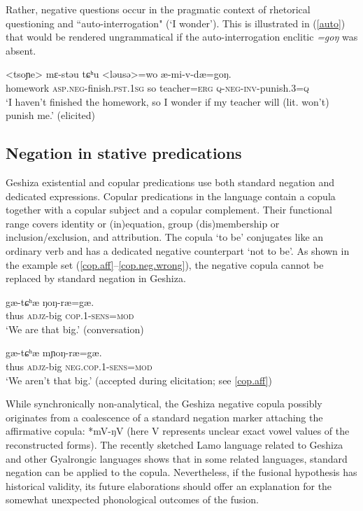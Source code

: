 \documentclass[output=paper,colorlinks,citecolor=brown]{langscibook}
\begin{document}
Rather, negative questions occur in the pragmatic context of rhetorical questioning and ``auto-interrogation" (`I wonder'). This is illustrated in (\ref{auto}) that would be rendered ungrammatical if the auto-interrogation enclitic \textit{=goŋ} was absent.

\ea
\label{auto}
\gll  <{tsoɲe}> {mɛ-stəu} {tɕʰu} 	<{ləusə}>{=wo} 	{æ-mi-v-dæ=goŋ}.\\  
homework	\textsc{asp.neg}-finish.\textsc{pst.1sg}		so		teacher=\textsc{erg}	\textsc{q-neg-inv}-punish.3=\textsc{q}\\ 
\glt `I haven’t finished the homework, so I wonder if my teacher will (lit. won’t) punish me.' (elicited) 
\z

\subsection{Negation in stative predications}\label{neg.stative}
Geshiza existential and copular predications use both standard negation and dedicated expressions. Copular predications in the language contain a copula together with a copular subject and a copular complement. Their functional range covers identity or (in)equation, group (dis)membership or inclusion/exclusion, and attribution. The copula  `to be' conjugates like an ordinary verb and has a dedicated negative counterpart  `not to be'. As shown in the example set (\ref{cop.aff}--\ref{cop.neg.wrong}), the negative copula cannot be replaced by standard negation in Geshiza.

\ea
\label{cop.aff}
    {gæ-tɕʰæ} {ŋoŋ-ræ=gæ.}\\ 
      thus  \textsc{adjz}-big   \textsc{cop.1-sens=mod}\\ 
\glt `We are that big.' (conversation)
\z

\ea
\label{cop.neg}
    {gæ-tɕʰæ} {mɲoŋ-ræ=gæ.}\\
      thus  \textsc{adjz}-big   \textsc{neg.cop.1-sens=mod}\\
\glt `We aren't that big.' (accepted during elicitation; see \ref{cop.aff})
\z

\z


While synchronically non-analytical, the Geshiza negative copula possibly originates from a coalescence of a standard negation marker attaching the affirmative copula: {*mV-ŋV} (here V represents unclear exact vowel values of the reconstructed forms). 
The recently sketched Lamo language related to Geshiza and other Gyalrongic languages shows that in some related languages, standard negation can be applied to the copula. Nevertheless, if the fusional hypothesis has historical validity, its future elaborations should offer an explanation for the somewhat unexpected  phonological outcomes of the fusion.
\end{document}
